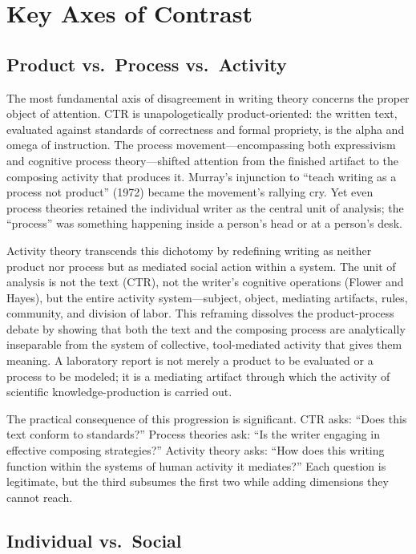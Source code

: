 \documentclass[12pt]{article}
\begin{document}
\section{Key Axes of Contrast}

\subsection{Product vs.\ Process vs.\ Activity}

The most fundamental axis of disagreement in writing theory concerns the proper object of attention. CTR is unapologetically product-oriented: the written text, evaluated against standards of correctness and formal propriety, is the alpha and omega of instruction. The process movement---encompassing both expressivism and cognitive process theory---shifted attention from the finished artifact to the composing activity that produces it. Murray's injunction to ``teach writing as a process not product'' (1972) became the movement's rallying cry. Yet even process theories retained the individual writer as the central unit of analysis; the ``process'' was something happening inside a person's head or at a person's desk.

Activity theory transcends this dichotomy by redefining writing as neither product nor process but as mediated social action within a system. The unit of analysis is not the text (CTR), not the writer's cognitive operations (Flower and Hayes), but the entire activity system---subject, object, mediating artifacts, rules, community, and division of labor. This reframing dissolves the product-process debate by showing that both the text and the composing process are analytically inseparable from the system of collective, tool-mediated activity that gives them meaning. A laboratory report is not merely a product to be evaluated or a process to be modeled; it is a mediating artifact through which the activity of scientific knowledge-production is carried out.

The practical consequence of this progression is significant. CTR asks: ``Does this text conform to standards?'' Process theories ask: ``Is the writer engaging in effective composing strategies?'' Activity theory asks: ``How does this writing function within the systems of human activity it mediates?'' Each question is legitimate, but the third subsumes the first two while adding dimensions they cannot reach.

\subsection{Individual vs.\ Social}
\end{document}
